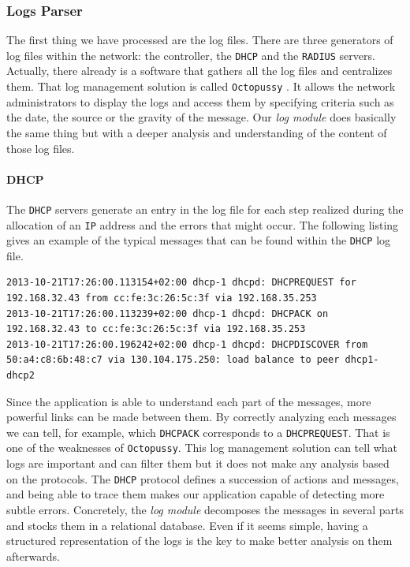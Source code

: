 \subsubsection{Logs Parser}
The first thing we have processed are the log files. There are three generators of log files within the network: the controller, the \texttt{DHCP} and the \texttt{RADIUS} servers. Actually, there already is a software that gathers all the log files and centralizes them. That log management solution is called \texttt{Octopussy} \cite{octopussy}. It allows the network administrators to display the logs and access them by specifying criteria such as the date, the source or the gravity of the message. Our \emph{log module} does basically the same thing but with a deeper analysis and understanding of the content of those log files. 

\paragraph*{DHCP}
The \texttt{DHCP} servers generate an entry in the log file for each step realized during the allocation of an \texttt{IP} address and the errors that might occur. The following listing gives an example of the typical messages that can be found within the \texttt{DHCP} log file.\\

\begin{lstlisting}[frame=single,breaklines=true,caption={Example of a \texttt{DHCP} log file}]
2013-10-21T17:26:00.113154+02:00 dhcp-1 dhcpd: DHCPREQUEST for 192.168.32.43 from cc:fe:3c:26:5c:3f via 192.168.35.253
2013-10-21T17:26:00.113239+02:00 dhcp-1 dhcpd: DHCPACK on 192.168.32.43 to cc:fe:3c:26:5c:3f via 192.168.35.253
2013-10-21T17:26:00.196242+02:00 dhcp-1 dhcpd: DHCPDISCOVER from 50:a4:c8:6b:48:c7 via 130.104.175.250: load balance to peer dhcp1-dhcp2
\end{lstlisting}

Since the application is able to understand each part of the messages, more powerful links can be made between them. By correctly analyzing each messages we can tell, for example, which \texttt{DHCPACK} corresponds to a \texttt{DHCPREQUEST}. That is one of the weaknesses of \texttt{Octopussy}. This log management solution can tell what logs are important and can filter them but it does not make any analysis based on the protocols. The \texttt{DHCP} protocol defines a succession of actions and messages, and being able to trace them makes our application capable of detecting more subtle errors. Concretely, the \emph{log module} decomposes the messages in several parts and stocks them in a relational database. Even if it seems simple, having a structured representation of the logs is the key to make better analysis on them afterwards.


